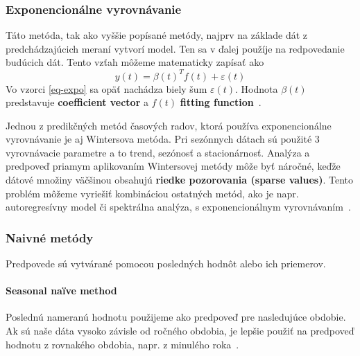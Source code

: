 \documentclass[a4paper,slovak,12pt,appendix]{article}
\begin{document}

\subsubsection{Exponencionálne vyrovnávanie}

Táto metóda, tak ako vyššie popísané metódy, najprv na základe dát
z predchádzajúcich meraní vytvorí model. Ten sa v ďalej použíje na
redpovedanie budúcich dát. Tento vzťah môžeme matematicky zapísať ako
\begin{equation}
  y(t) = \beta(t)^T f(t) + \varepsilon(t)
  \label{eq-expo}
\end{equation}
Vo vzorci \ref{eq-expo} sa opäť nachádza biely šum $\varepsilon(t)$. Hodnota
$\beta(t)$ predstavuje \textbf{coefficient vector} a $f(t)$
\textbf{fitting function}~\cite{Mahalakshmi2016}.

Jednou z predikčných metód časových radov, ktorá používa exponencionálne
vyrovnávanie je aj Wintersova metóda. Pri sezónnych dátach sú použité 3
vyrovnávacie parametre a to trend, sezónosť a stacionárnosť. Analýza
a predpoveď priamym aplikovaním Wintersovej metódy môže byť náročné, keďže
dátové množiny väčšinou obsahujú \textbf{riedke pozorovania (sparse values)}.
Tento problém môžeme vyriešiť kombináciou ostatných metód, ako je napr.
autoregresívny model či spektrálna analýza, s exponencionálnym
vyrovnávaním~\cite{Mahalakshmi2016}.




\subsubsection{Naivné metódy}
Predpovede sú vytvárané pomocou posledných hodnôt alebo ich priemerov.

\paragraph{Seasonal naïve method}
Poslednú nameranú hodnotu použijeme ako predpoveď pre nasledujúce obdobie. Ak
sú naše dáta vysoko závisle od ročného obdobia, je lepšie použiť na predpoveď
hodnotu z rovnakého obdobia, napr. z minulého roka~\cite{Grmanova2016}.
\end{document}
